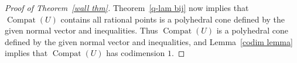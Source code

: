 \documentclass{amsart}
\theoremstyle{definition}
\theoremstyle{remark}
\numberwithin{equation}{section}
\newcommand{\0}{{\mathbf{0}}}
\renewcommand{\S}{\mathbf{S}}
\newcommand{\Compat}{\operatorname{Compat}}
\begin{document}
\begin{proof}[Proof of Theorem~\ref{wall thm}]
%
%
%
Theorem~\ref{q-lam bij} now implies that $\Compat(U)$ contains all rational points is a polyhedral cone defined by the given normal vector and inequalities.
Thus $\Compat(U)$ is a polyhedral cone defined by the given normal vector and inequalities, and Lemma~\ref{codim lemma} implies that $\Compat(U)$ has codimension $1$.
\end{proof}
\end{document}
